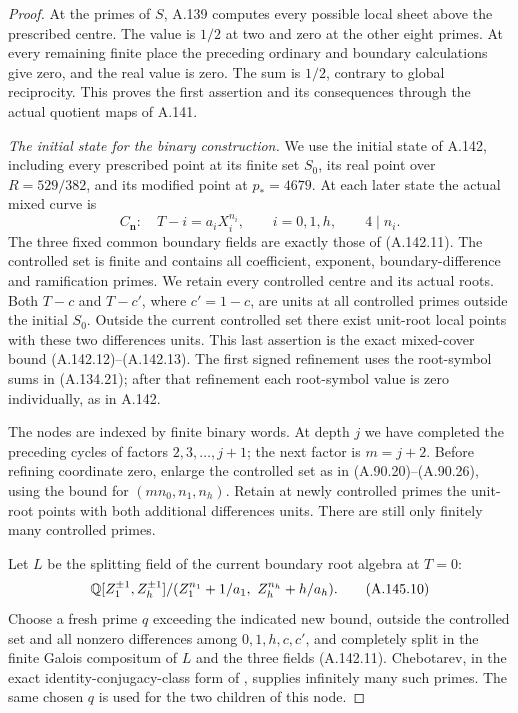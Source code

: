 \begin{proof}
At the primes of \(S\), A.139 computes every possible local
sheet above the prescribed centre.  The value is \(1/2\) at
two and zero at the other eight primes.  At every remaining
finite place the preceding ordinary and boundary calculations
give zero, and the real value is zero.  The sum is \(1/2\),
contrary to global reciprocity.  This proves the first assertion
and its consequences through the actual quotient maps of A.141.

\emph{The initial state for the binary construction.}
We use the initial state of A.142, including every prescribed
point at its finite set \(S_0\), its real point over
\(R=529/382\), and its modified point at \(p_*=4679\).
At each later state the actual mixed curve is
\[
       C_{\boldsymbol n}:\quad T-i=a_iX_i^{n_i},
                   \qquad i=0,1,h,\qquad 4\mid n_i.
\tag{A.145.9}
\]
The three fixed common boundary fields are exactly those of
(A.142.11).  The controlled set is finite and contains all
coefficient, exponent, boundary-difference and ramification
primes.  We retain every controlled centre and its actual
roots.  Both \(T-c\) and \(T-c'\), where \(c'=1-c\),
are units at all controlled primes outside the initial \(S_0\).
Outside the current controlled set there exist unit-root local
points with these two differences units.  This last assertion
is the exact mixed-cover bound (A.142.12)--(A.142.13).
The first signed refinement uses the root-symbol sums in
(A.134.21); after that refinement each root-symbol value is zero
individually, as in A.142.

The nodes are indexed by finite binary words.  At depth \(j\)
we have completed the preceding cycles of factors
\(2,3,\ldots,j+1\); the next factor is \(m=j+2\).
Before refining coordinate zero, enlarge the controlled set
as in (A.90.20)--(A.90.26), using the bound for
\((mn_0,n_1,n_h)\).  Retain at newly controlled primes the
unit-root points with both additional differences units.
There are still only finitely many controlled primes.

Let \(L\) be the splitting field of the current boundary
root algebra at \(T=0\):
\[
 \mathbb Q[Z_1^{\pm1},Z_h^{\pm1}]/
       (Z_1^{n_1}+1/a_1,\ Z_h^{n_h}+h/a_h).
\tag{A.145.10}
\]
Choose a fresh prime \(q\) exceeding the indicated new bound,
outside the controlled set and all nonzero differences among
\(0,1,h,c,c'\), and completely split in the finite Galois
compositum of \(L\) and the three fields (A.142.11).
Chebotarev, in the exact identity-conjugacy-class form of
\cite[Theorem 8.31]{AgentMilneANT}, supplies infinitely many
such primes.  The same chosen \(q\) is used for the two
children of this node.


\end{proof}
